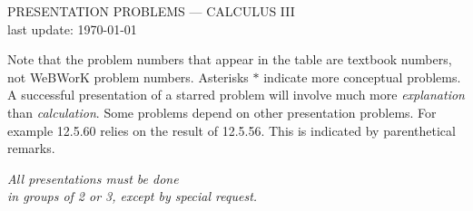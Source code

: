\documentclass[12pt]{amsart}
\begin{document}
\begin{center}
    PRESENTATION PROBLEMS --- CALCULUS III \\ last update: \today
\end{center}

Note that the problem numbers that appear in the table are textbook numbers, 
not WeBWorK problem numbers. Asterisks $\ast$ indicate more conceptual 
problems. A successful presentation of a starred problem will involve much
more \emph{explanation} than \emph{calculation}. Some problems depend 
on other presentation problems. For example 12.5.60 relies on the result of 
12.5.56. This is indicated by parenthetical remarks.

\begin{center}
    {\large \emph{All presentations must be done\\ in groups of 2 or 3, except by special request.}}
\end{center}
\end{document}
